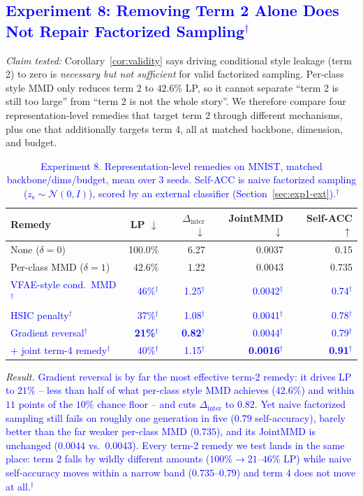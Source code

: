 \documentclass[10pt,letterpaper]{article}
\newcommand{\zs}{z_{\mathrm{s}}}
\newcommand{\pj}[1]{\textcolor{blue}{#1$^{\dagger}$}}
\begin{document}
\subsection{\pj{Experiment 8: Removing Term 2 Alone Does Not Repair Factorized Sampling}}
\label{sec:exp8}

\emph{Claim tested:} Corollary~\ref{cor:validity} says driving conditional
style leakage (term 2) to zero is \emph{necessary but not sufficient} for
valid factorized sampling. Per-class style MMD only reduces term 2 to
$42.6\%$ LP, so it cannot separate ``term 2 is still too large'' from ``term
2 is not the whole story''. We therefore compare four representation-level
remedies that target term 2 through different mechanisms, plus one that
additionally targets term 4, all at matched backbone, dimension, and budget.

\begin{table}[t]
\centering
\small
\setlength{\tabcolsep}{3.5pt}
\caption{\pj{Experiment 8. Representation-level remedies on MNIST, matched
         backbone/dims/budget, mean over 3 seeds. Self-ACC is naive
         factorized sampling ($\zs\sim\mathcal N(0,I)$), scored by an
         external classifier (Section~\ref{sec:exp1-ext}).}}
\label{tab:invariance}
\begin{tabular}{lrrrr}
\toprule
Remedy & LP $\downarrow$ & $\Delta_{\mathrm{inter}}$ $\downarrow$ & JointMMD $\downarrow$ & Self-ACC $\uparrow$ \\
\midrule
None ($\delta{=}0$)        & 100.0\% & 6.27 & 0.0037 & 0.15 \\
\midrule
Per-class MMD ($\delta{=}1$) & 42.6\% & 1.22 & 0.0043 & 0.735 \\
\pj{VFAE-style cond.\ MMD} & \pj{46\%} & \pj{1.25} & \pj{0.0042} & \pj{0.74} \\
\pj{HSIC penalty}          & \pj{37\%} & \pj{1.08} & \pj{0.0041} & \pj{0.78} \\
\pj{Gradient reversal}     & \pj{\textbf{21\%}} & \pj{\textbf{0.82}} & \pj{0.0044} & \pj{0.79} \\
\midrule
\pj{$+$ joint term-4 remedy} & \pj{40\%} & \pj{1.15} & \pj{\textbf{0.0016}} & \pj{\textbf{0.91}} \\
\bottomrule
\end{tabular}
\end{table}

\emph{Result.} \pj{Gradient reversal is by far the most effective term-2
remedy: it drives LP to $21\%$ -- less than half of what per-class style MMD
achieves ($42.6\%$) and within $11$ points of the $10\%$ chance floor -- and
cuts $\Delta_{\mathrm{inter}}$ to $0.82$. Yet naive factorized sampling
still fails on roughly one generation in five ($0.79$ self-accuracy), barely
better than the far weaker per-class MMD ($0.735$), and its JointMMD is
unchanged ($0.0044$ vs.\ $0.0043$). Every term-2 remedy we test lands in the
same place: term 2 falls by wildly different amounts ($100\%\to21$--$46\%$
LP) while naive self-accuracy moves within a narrow band
($0.735$--$0.79$) and term 4 does not move at all.}
\end{document}

